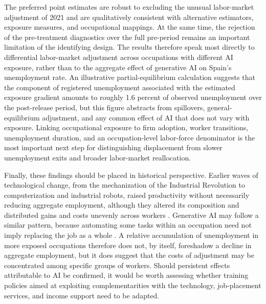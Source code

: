 The preferred point estimates are robust to excluding the unusual labor-market adjustment of 2021 and are qualitatively consistent with alternative estimators, exposure measures, and occupational mappings. At the same time, the rejection of the pre-treatment diagnostics over the full pre-period remains an important limitation of the identifying design. The results therefore speak most directly to differential labor-market adjustment across occupations with different AI exposure, rather than to the aggregate effect of generative AI on Spain's unemployment rate. An illustrative partial-equilibrium calculation suggests that the component of registered unemployment associated with the estimated exposure gradient amounts to roughly 1.6 percent of observed unemployment over the post-release period, but this figure abstracts from spillovers, general-equilibrium adjustment, and any common effect of AI that does not vary with exposure. Linking occupational exposure to firm adoption, worker transitions, unemployment duration, and an occupation-level labor-force denominator is the most important next step for distinguishing displacement from slower unemployment exits and broader labor-market reallocation.

Finally, these findings should be placed in historical perspective. Earlier waves of technological change, from the mechanization of the Industrial Revolution to computerization and industrial robots, raised productivity without necessarily reducing aggregate employment, although they altered its composition and distributed gains and costs unevenly across workers \citep{autor_2015}. Generative AI may follow a similar pattern, because automating some tasks within an occupation need not imply replacing the job as a whole \citep{acemoglu_restrepo_2019,garicano2026messy}. A relative accumulation of unemployment in more exposed occupations therefore does not, by itself, foreshadow a decline in aggregate employment, but it does suggest that the costs of adjustment may be concentrated among specific groups of workers. Should persistent effects attributable to AI be confirmed, it would be worth assessing whether training policies aimed at exploiting complementarities with the technology, job-placement services, and income support need to be adapted.




\clearpage



\appendix

\setcounter{figure}{0}
\setcounter{table}{0}
\renewcommand{\thefigure}{\Alph{section}.\arabic{figure}}
\renewcommand{\thetable}{\Alph{section}.\arabic{table}}
\renewcommand{\theHfigure}{\Alph{section}.\arabic{figure}}
\renewcommand{\theHtable}{\Alph{section}.\arabic{table}}
\makeatletter
{}
\makeatother

